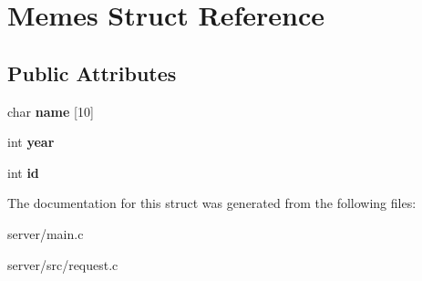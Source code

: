 \hypertarget{structMemes}{\section{Memes Struct Reference}
\label{structMemes}
}
\subsection*{Public Attributes}
\begin{DoxyCompactItemize}
\item 
\hypertarget{structMemes_a55706eb7ff6cad5039f478bb2247d7bd}{char {\bfseries name} \mbox{[}10\mbox{]}}\label{structMemes_a55706eb7ff6cad5039f478bb2247d7bd}

\item 
\hypertarget{structMemes_abec627df416526f6efa97e2c1e74f000}{int {\bfseries year}}\label{structMemes_abec627df416526f6efa97e2c1e74f000}

\item 
\hypertarget{structMemes_a57e3a2dcf2eb73f7bb2ca166e9222491}{int {\bfseries id}}\label{structMemes_a57e3a2dcf2eb73f7bb2ca166e9222491}

\end{DoxyCompactItemize}


The documentation for this struct was generated from the following files\-:\begin{DoxyCompactItemize}
\item 
server/main.\-c\item 
server/src/request.\-c\end{DoxyCompactItemize}
